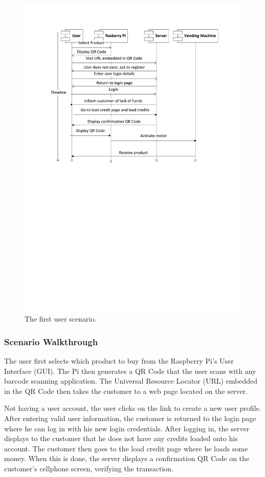 \begin{figure}
 \centering 
 \includegraphics[clip=true, trim = 0 410 0 60,
 scale=0.7]{user_story_1}
 \caption{The first user scenario.}
 \label{fig:test1}
\end{figure}

\subsubsection{Scenario Walkthrough}

The user first selects which product to buy from the Raspberry
Pi's User Interface (GUI). The Pi then generates a QR Code that the
user scans with any barcode scanning application. The Universal Resource Locator (URL)
embedded in the QR Code then takes the customer to a web page located on the server. 

Not having a user account, the user clicks on the link to create a new user
profile. After entering valid user information, the customer is returned to the login  page where he
can log in with his new login credentials. After logging in, the server
displays to the customer that he does not have any credits loaded onto his
account. The customer then goes to the load credit page where he loads some
money. When this is done, the server displays a confirmation QR Code on the
customer's cellphone screen, verifying the transaction.


